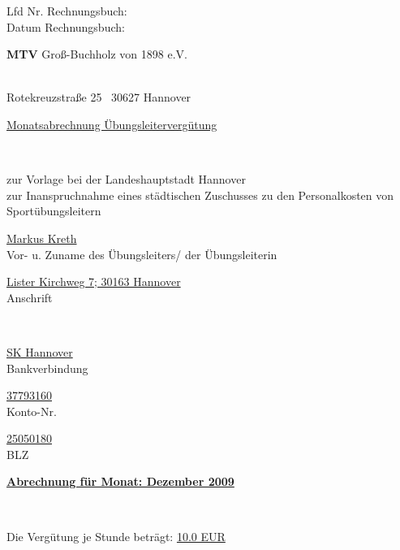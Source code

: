 \documentclass[a4paper,10pt,BCOR=0mm]{scrreprt}
\begin{document}
\begin{flushright}
\parbox{6cm}{Lfd Nr. Rechnungsbuch: \hrulefill \\
Datum Rechnungsbuch: \hrulefill }
\end{flushright}
\begin{center}
\begin{Large}\textbf{MTV} Groß-Buchholz von 1898 e.V.                                        \end{Large}\\
Rotekreuzstraße 25 \textperiodcentered\ 30627 Hannover\\[.4cm]
\begin{huge}\underline{Monatsabrechnung Übungsleitervergütung}\end{huge}\\
\begin{scriptsize}zur Vorlage bei der Landeshauptstadt Hannover\\
zur Inanspruchnahme eines städtischen Zuschusses zu den Personalkosten von Sportübungsleitern\\[.7cm]
\end{scriptsize}

\parbox{0,49\textwidth}{
\begin{center}
\hrulefill\underline{Markus Kreth}\hrulefill\\
Vor- u. Zuname des Übungsleiters/ der Übungsleiterin
\end{center}
}
\hfill
\parbox{0,49\textwidth}{\begin{center}
\hrulefill\underline{Lister Kirchweg 7; 30163 Hannover}\hrulefill\\
Anschrift\end{center}}\\[.7cm]
\parbox{0,32\textwidth}{
\begin{center}
\hrulefill\underline{SK Hannover}\hrulefill\\
Bankverbindung
\end{center}
}
\hfill
\parbox{0,32\textwidth}{
\begin{center}
\hrulefill\underline{37793160}\hrulefill\\
Konto-Nr.
\end{center}
}
\hfill
\parbox{0,32\textwidth}{
\begin{center}
\hrulefill\underline{25050180}\hrulefill\\
BLZ
\end{center}
}
\parbox{12cm}{\begin{large}\underline{\textbf{Abrechnung für Monat: Dezember 2009}}\end{large}}\\
\parbox{9cm}{Die Vergütung je Stunde beträgt: \underline{10.0 EUR}}
\end{center}\begin{flushright}


\end{flushright}
\end{document}
